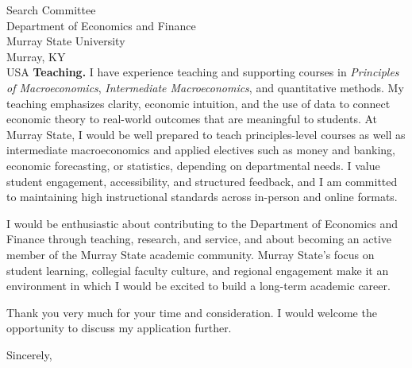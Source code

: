 \documentclass[11pt,letterpaper]{letter}
\begin{document}
\begin{letter}{Search Committee \\
Department of Economics and Finance \\
Murray State University \\
Murray, KY \\ USA}
\textbf{Teaching.} I have experience teaching and supporting courses in \textit{Principles of Macroeconomics}, \textit{Intermediate Macroeconomics}, and quantitative methods. My teaching emphasizes clarity, economic intuition, and the use of data to connect economic theory to real-world outcomes that are meaningful to students. At Murray State, I would be well prepared to teach principles-level courses as well as intermediate macroeconomics and applied electives such as money and banking, economic forecasting, or statistics, depending on departmental needs. I value student engagement, accessibility, and structured feedback, and I am committed to maintaining high instructional standards across in-person and online formats.

I would be enthusiastic about contributing to the Department of Economics and Finance through teaching, research, and service, and about becoming an active member of the Murray State academic community. Murray State’s focus on student learning, collegial faculty culture, and regional engagement make it an environment in which I would be excited to build a long-term academic career.

Thank you very much for your time and consideration. I would welcome the opportunity to discuss my application further.

\closing{Sincerely,}

\end{letter}
\end{document}
